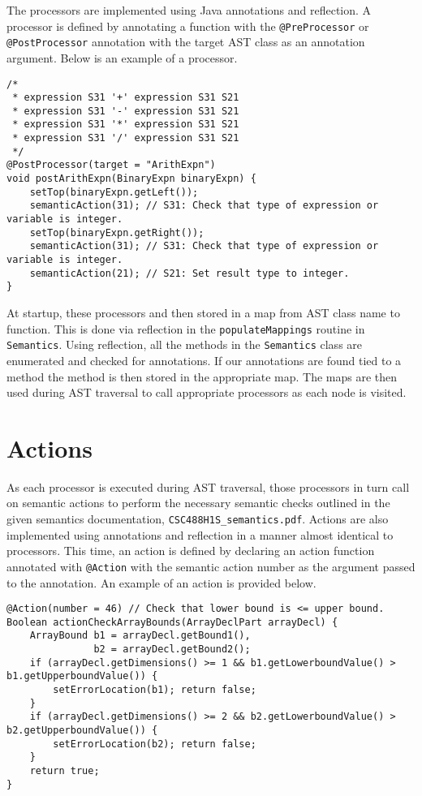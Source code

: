 \documentclass[oneside]{amsart}
\theoremstyle{definition}
\theoremstyle{remark}
\numberwithin{equation}{section}
\begin{document}
The processors are implemented using Java annotations and reflection. A
processor is defined by  annotating a function with the \texttt{@PreProcessor}
or \texttt{@PostProcessor} annotation with the target AST class as an annotation
argument. Below is an example of a processor.

\begin{lstlisting}
/*
 * expression S31 '+' expression S31 S21
 * expression S31 '-' expression S31 S21
 * expression S31 '*' expression S31 S21
 * expression S31 '/' expression S31 S21
 */
@PostProcessor(target = "ArithExpn")
void postArithExpn(BinaryExpn binaryExpn) {
    setTop(binaryExpn.getLeft());
    semanticAction(31); // S31: Check that type of expression or variable is integer.
    setTop(binaryExpn.getRight());
    semanticAction(31); // S31: Check that type of expression or variable is integer.
    semanticAction(21); // S21: Set result type to integer.
}
\end{lstlisting}

At startup, these processors and then stored in a map from AST class name to
function. This is done via reflection in the \texttt{populateMappings} routine
in \texttt{Semantics}. Using reflection, all the methods in the
\texttt{Semantics} class are enumerated and checked for annotations. If our
annotations are found tied to a method the method is then stored in the
appropriate map. The maps are then used during AST traversal to call appropriate
processors as each node is visited.

\section{Actions}

As each processor is executed during AST traversal, those processors in turn
call on semantic actions to perform the necessary semantic checks outlined in
the given semantics documentation, \texttt{CSC488H1S\_semantics.pdf}. Actions
are also implemented using annotations and reflection in a manner almost
identical to processors. This time, an action is defined by declaring an action
function annotated with \texttt{@Action} with the semantic action number as the
argument passed to the annotation. An example of an action is provided below.

\begin{lstlisting}
@Action(number = 46) // Check that lower bound is <= upper bound.
Boolean actionCheckArrayBounds(ArrayDeclPart arrayDecl) {
    ArrayBound b1 = arrayDecl.getBound1(),
               b2 = arrayDecl.getBound2();
    if (arrayDecl.getDimensions() >= 1 && b1.getLowerboundValue() > b1.getUpperboundValue()) {
        setErrorLocation(b1); return false;
    }
    if (arrayDecl.getDimensions() >= 2 && b2.getLowerboundValue() > b2.getUpperboundValue()) {
        setErrorLocation(b2); return false;
    }
    return true;
}
\end{lstlisting}
\end{document}
